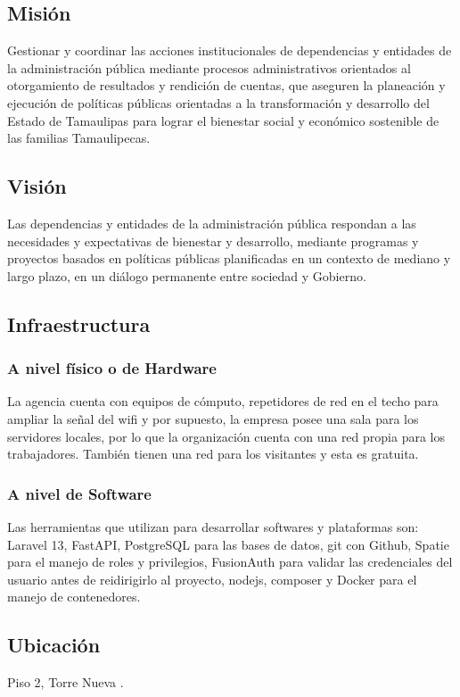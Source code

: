 \documentclass[12pt]{article}
\begin{document}
\subsection{Misión}
Gestionar y coordinar las acciones institucionales de dependencias y entidades de la administración pública mediante procesos administrativos orientados al otorgamiento de resultados y rendición de cuentas, que aseguren la planeación y ejecución de políticas públicas orientadas a la transformación y desarrollo del Estado de Tamaulipas para lograr el bienestar social y económico sostenible de las familias Tamaulipecas.

\subsection{Visión}
Las dependencias y entidades de la administración pública respondan a las necesidades y expectativas de bienestar y desarrollo, mediante programas y proyectos basados en políticas públicas planificadas en un contexto de mediano y largo plazo, en un diálogo permanente entre sociedad y Gobierno.

\subsection{Infraestructura}
\subsubsection{A nivel físico o de Hardware}
La agencia cuenta con equipos de cómputo, repetidores de red en el techo para ampliar la señal del wifi y por supuesto, la empresa posee una sala para los servidores locales, por lo que la organización cuenta con una red propia para los trabajadores. También tienen una red para los visitantes y esta es gratuita.



\subsubsection{A nivel de Software}
Las herramientas que utilizan para desarrollar softwares y plataformas son: Laravel 13,
FastAPI, PostgreSQL para las bases de datos, git con Github, Spatie para el manejo de roles y
privilegios, FusionAuth para validar las credenciales del usuario antes de reidirigirlo al proyecto,
nodejs, composer y Docker para el manejo de contenedores.


\subsection{Ubicación}
Piso 2, Torre Nueva \cite{AIIDT:Ubicacion}.
\end{document}
